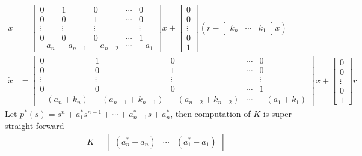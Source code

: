 \documentclass[twoside]{article}
\begin{document}
\begin{align*}
\dot{x} &= \left[ \begin{array}{ccccc} 0 & 1 & 0 & \cdots & 0 \\ 0 & 0 & 1 &
                                                                      \cdots & 0
\\ \vdots & \vdots & \vdots & & \vdots
\\ 0 & 0 & 0 & \cdots & 1
    \\ -a_n & -a_{n-1} & -a_{n-2} & \cdots & -a_1 \end{array} \right] x 
+ \left[ \begin{array}{c} 0\\ 0 \\ \vdots \\ 0 \\ 1 \end{array}
  \right] 
 \left( r - 
\left[ \begin{array}{ccc} k_n & \cdots & k_1 \end{array} \right]
x \right)
\\
\dot{x} &= \left[ \begin{array}{ccccc} 0 & 1 & 0 & \cdots & 0 \\ 0 & 0 & 1 &
                                                                      \cdots & 0
\\ \vdots & \vdots & \vdots & & \vdots
\\ 0 & 0 & 0 & \cdots & 1
    \\ -(a_n+k_n) & -(a_{n-1} + k_{n-1}) & -(a_{n-2} + k_{n-2}) &
                                                                  \cdots
                                                         & -(a_1 +
                                                           k_1) \end{array}
                                                           \right] x
+ \left[ \begin{array}{c} 0\\ 0 \\ \vdots \\ 0 \\ 1 \end{array}
  \right] r
\end{align*}
%
Let $p^*(s) = s^n + a_1^* s^{n-1} + \cdots + a_{n-1}^* s + a_n^*$, then
computation of $K$ is super straight-forward
%
\begin{align*}
  K = \left[ \begin{array}{ccc} (a^*_n - a_n) & \cdots & (a^*_1 - a_1) \end{array} \right]
\end{align*}
\end{document}
